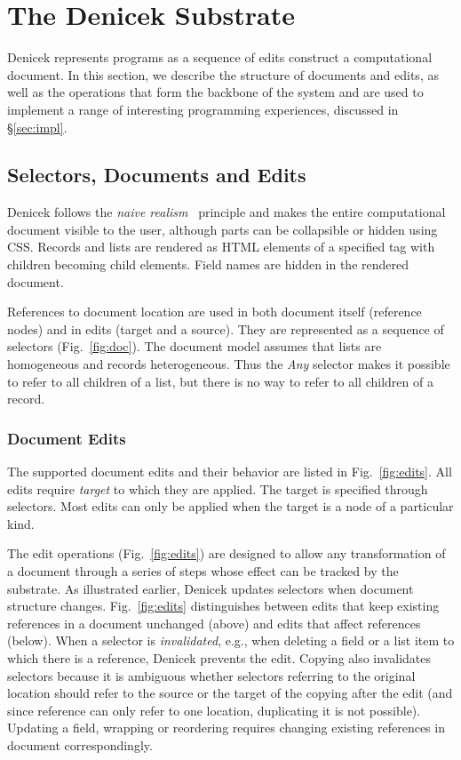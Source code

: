 \documentclass[sigconf]{acmart}
\begin{document}
\section{The Denicek Substrate}
\label{sec:system}
Denicek represents programs as a sequence of edits construct a computational document.
In this section, we describe the structure of documents and edits, as well as the
operations that form the backbone of the system and are used to implement a range of
interesting programming experiences, discussed in \S\ref{sec:impl}.

\subsection{Selectors, Documents and Edits}
Denicek follows the \emph{naive realism}~\cite{disessa-1986-boxer} principle and makes the entire
computational document visible to the user, although parts can be collapsible or hidden using CSS.
Records and lists are rendered as HTML elements of a specified tag with children becoming child
elements. Field names are hidden in the rendered document.

References to document location are used in both document itself (reference nodes) and in edits
(target and a source). They are represented as a sequence of selectors (Fig.~\ref{fig:doc}).
The document model assumes that lists are homogeneous and records heterogeneous. Thus the
\textit{Any} selector makes it possible to refer to all children of a list, but there is no
way to refer to all children of a record.

\subsubsection*{Document Edits}
The supported document edits and their behavior are listed in Fig.~\ref{fig:edits}. All edits
require \emph{target} to which they are applied. The target is specified through selectors.
Most edits can only be applied when the target is a node of a particular kind.

The edit operations (Fig.~\ref{fig:edits}) are designed to allow any transformation of a document
through a series of steps whose effect can be tracked by the substrate. As illustrated earlier,
Denicek updates selectors when document structure changes. Fig.~\ref{fig:edits} distinguishes
between edits that keep existing references in a document unchanged (above) and edits that affect
references (below). When a selector is \emph{invalidated}, e.g., when deleting a field or a
list item to which there is a reference, Denicek prevents the edit. Copying also invalidates
selectors because it is ambiguous whether selectors referring to the original location should
refer to the source or the target of the copying after the edit (and since reference can only
refer to one location, duplicating it is not possible). Updating a field, wrapping or reordering
requires changing existing references in document correspondingly.
\end{document}
